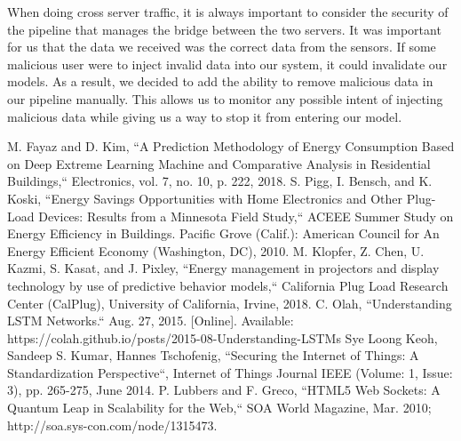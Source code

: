 \documentclass[conference]{IEEEtran}
\begin{document}
When doing cross server traffic, it is always important to consider the security of the pipeline that manages the bridge between the two servers. It was important for us that the data we received was the correct data from the sensors. If some malicious user were to inject invalid data into our system, it could invalidate our models. As a result, we decided to add the ability to remove malicious data in our pipeline manually. This allows us to monitor any possible intent of injecting malicious data while giving us a way to stop it from entering our model.


\begin{thebibliography}{00}
 M. Fayaz and D. Kim, ``A Prediction Methodology of Energy Consumption Based on Deep Extreme Learning Machine and Comparative Analysis in Residential Buildings,`` Electronics, vol. 7, no. 10, p. 222, 2018.
 S. Pigg, I. Bensch, and K. Koski, ``Energy Savings Opportunities with Home Electronics and Other Plug-Load Devices: Results from a Minnesota Field Study,`` ACEEE Summer Study on Energy Efficiency in Buildings. Pacific Grove (Calif.): American Council for An Energy Efficient Economy (Washington, DC), 2010.
 M. Klopfer, Z. Chen, U. Kazmi, S. Kasat, and J. Pixley, ``Energy management in projectors and display technology by use of predictive behavior models,`` California Plug Load Research Center (CalPlug), University of California, Irvine, 2018.
 C. Olah, ``Understanding LSTM Networks.`` Aug. 27, 2015. [Online]. Available: https://colah.github.io/posts/2015-08-Understanding-LSTMs
 Sye Loong Keoh, Sandeep S. Kumar, Hannes Tschofenig, ``Securing the Internet of
Things: A Standardization Perspective``, Internet of Things Journal IEEE (Volume:
1, Issue: 3), pp. 265-275, June 2014.
 P. Lubbers and F. Greco, ``HTML5 Web Sockets: A Quantum Leap in Scalability for the Web,`` SOA World Magazine, Mar. 2010; http://soa.sys-con.com/node/1315473.
\end{thebibliography}
\end{document}
